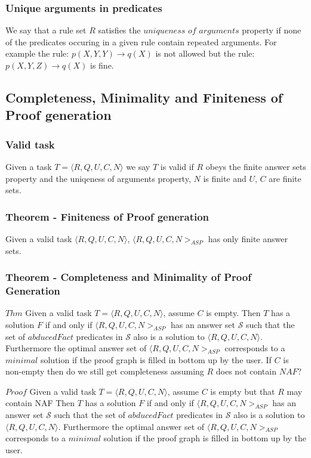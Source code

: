  \subsubsection{Unique arguments in predicates}
We say that a rule set $R$ satisfies the $uniqueness$ $of$ $arguments$ property if none of the predicates occuring in a given rule contain repeated arguments. For example the rule:
$p(X,Y,Y)\rightarrow q(X)$ is not allowed but the rule: $p(X,Y,Z)\rightarrow q(X)$ is fine. 

\subsection{Completeness, Minimality and Finiteness of Proof generation}

\subsubsection{Valid task}
Given a task $T = \langle R,Q,U,C,N\rangle$ we say $T$ is valid if $R$ obeys the finite answer sets property and the uniqeness of arguments property, $N$ is finite and $U$, $C$ are finite sets. 

\subsubsection{Theorem - Finiteness of Proof generation}
Given a valid task $\langle R,Q,U,C,N\rangle$, $\langle R,Q,U,C,N>_{ASP}$ has only finite answer sets. 

\subsubsection{Theorem - Completeness and Minimality of Proof Generation}
$Thm$ Given a valid task $T= \langle R,Q,U,C,N\rangle$, assume $C$ is empty. Then $T$ has a solution $F$ if and only if $\langle R,Q,U,C,N>_{ASP}$ has an answer set $\mathcal{S}$ such that the set of $abducedFact$ predicates in $\mathcal{S}$ also is a solution to $\langle R,Q,U,C,N\rangle$. Furthermore the optimal answer set of $\langle R,Q,U,C,N>_{ASP}$ corresponds to a $minimal$ solution if the proof graph is filled in bottom up by the user. If $C$ is non-empty then do we still get completeness assuming $R$ does not contain $NAF$?

$Proof$
Given a valid task $T= \langle R,Q,U,C,N\rangle$, assume $C$ is empty but that $R$ may contain NAF Then $T$ has a solution $F$ if and only if $\langle R,Q,U,C,N>_{ASP}$ has an answer set $\mathcal{S}$ such that the set of $abducedFact$ predicates in $\mathcal{S}$ also is a solution to $\langle R,Q,U,C,N\rangle$. Furthermore the optimal answer set of $\langle R,Q,U,C,N>_{ASP}$ corresponds to a $minimal$ solution if the proof graph is filled in bottom up by the user.

